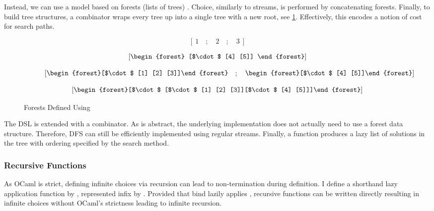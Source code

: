 Instead, we can use a model based on forests (lists of trees) \cite{Bunches}. Choice, similarly to streams, is performed by concatenating forests. Finally, to build tree structures, a  combinator wraps every tree up into a single tree with a new root, see \cref{fig:Wrap}. Effectively, this encodes a  notion of cost for search paths.

\begin{figure}[h]
\centering
\begin{subfigure}{0.45\textwidth}
\centering
\[\left[\ 1\quad ; \quad 2 \quad ; \quad 3\ \right]\]
\caption{  }
\end{subfigure}
\begin{subfigure}{0.45\textwidth}
\centering
\[\left[\vcenter{\hbox{\begin{forest}
[$\cdot$ [4] [5]]
\end{forest}}}\right]\]
\caption{}
\end{subfigure}
\begin{subfigure}{0.45\textwidth}
\centering
\[\left[\vcenter{\hbox{\begin{forest}[$\cdot$ [1] [2] [3]]\end{forest}}} \quad ; \quad\vcenter{\hbox{\begin{forest}[$\cdot$ [4] [5]]\end{forest}}}\right]\]
\caption{}
\end{subfigure}
\begin{subfigure}{0.45\textwidth}
\centering
\[\left[\vcenter{\hbox{\begin{forest}[$\cdot$ [$\cdot$ [1] [2] [3]][$\cdot$ [4] [5]]]\end{forest}}}\right]\]
\caption{}
\end{subfigure}
\caption{Forests Defined Using }
\label{fig:Wrap}
\end{figure}

The DSL is extended with a  combinator. As  is abstract, the underlying implementation does not actually need to use a forest data structure. Therefore, DFS can still be efficiently implemented using regular streams. Finally, a  function produces a lazy list of solutions in the tree with ordering specified by the search method.

\subsubsection{Recursive Functions}
As OCaml is strict, defining infinite choices via recursion can lead to non-termination during definition. I define a shorthand lazy application function  by , represented infix by \code{|>-}. Provided that bind lazily applies , recursive functions can be written directly resulting in infinite choices without OCaml's strictness leading to infinite recursion.

